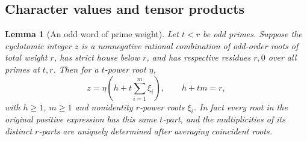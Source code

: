 \documentclass[11pt,a4paper]{article}
\numberwithin{equation}{section}
\newtheorem{lemma}[theorem]{Lemma}
\theoremstyle{remark}
\begin{document}
\subsection{Character values and tensor products}\label{fam:Q:sec:2}
\begin{lemma}[An odd word of prime weight]\label{fam:Q:2.4}\label{fam:Q:n:lem:oddword}
Let $t<r$ be odd primes. Suppose the cyclotomic integer $z$ is a
nonnegative rational combination of odd-order roots of total weight
$r$, has strict house below $r$, and has respective residues
$r,0$ over all primes at $t,r$. Then for a $t$-power root $\eta$,
\[
 z=\eta\left(h+t\sum_{i=1}^{m}\xi_i\right),\qquad
 h+tm=r,
\]
with $h\ge1$, $m\ge1$ and nonidentity $r$-power roots $\xi_i$.
In fact every root in the original positive expression has this same
$t$-part, and the multiplicities of its distinct $r$-parts are uniquely
determined after averaging coincident roots.
\end{lemma}
\end{document}
